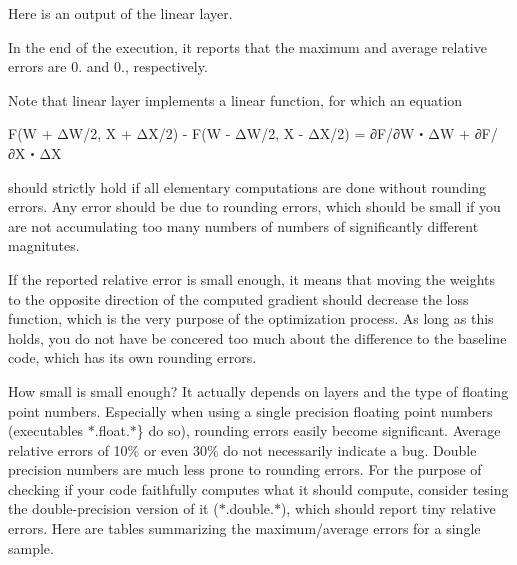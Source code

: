 Here is an output of the linear layer.




In the end of the execution, it reports that the maximum and average relative errors are 0. and 0., respectively.

Note that linear layer implements a linear function, for which an equation \begin{DoxyVerb}F(W + ΔW/2, X + ΔX/2) - F(W - ΔW/2, X - ΔX/2) = ∂F/∂W・ΔW + ∂F/∂X・ΔX
\end{DoxyVerb}


should strictly hold if all elementary computations are done without rounding errors. Any error should be due to rounding errors, which should be small if you are not accumulating too many numbers of numbers of significantly different magnitutes.

If the reported relative error is small enough, it means that moving the weights to the opposite direction of the computed gradient should decrease the loss function, which is the very purpose of the optimization process. As long as this holds, you do not have be concered too much about the difference to the baseline code, which has its own rounding errors.

How small is small enough? It actually depends on layers and the type of floating point numbers. Especially when using a single precision floating point numbers (executables $\ast$.float.$\ast$\} do so), rounding errors easily become significant. Average relative errors of 10\% or even 30\% do not necessarily indicate a bug. Double precision numbers are much less prone to rounding errors. For the purpose of checking if your code faithfully computes what it should compute, consider tesing the double-\/precision version of it ($\ast$.double.$\ast$), which should report tiny relative errors. Here are tables summarizing the maximum/average errors for a single sample.

